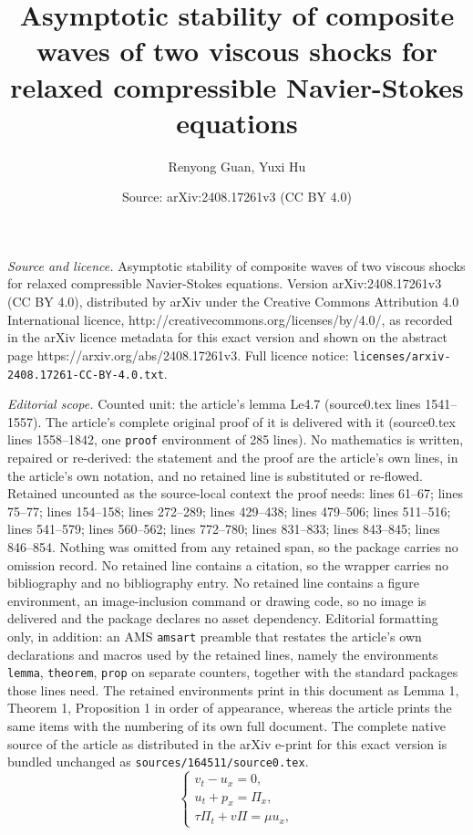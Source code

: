 \documentclass[10pt,a4paper]{amsart}
\title{Asymptotic stability of composite waves of two viscous shocks for relaxed compressible Navier-Stokes equations}
\author{Renyong Guan, Yuxi Hu}
\date{Source: arXiv:2408.17261v3 (CC BY 4.0)}
\begin{document}
\maketitle

\noindent\emph{Source and licence.} Asymptotic stability of composite waves of two viscous shocks for relaxed compressible Navier-Stokes equations. Version arXiv:2408.17261v3 (CC BY 4.0), distributed by arXiv under the Creative Commons Attribution 4.0 International licence, http://creativecommons.org/licenses/by/4.0/, as recorded in the arXiv licence metadata for this exact version and shown on the abstract page https://arxiv.org/abs/2408.17261v3. Full licence notice: \texttt{licenses/arxiv-2408.17261-CC-BY-4.0.txt}.\par\smallskip

\noindent\textit{Editorial scope.} Counted unit: the article's lemma Le4.7 (source0.tex lines 1541--1557). The article's complete original proof of it is delivered with it (source0.tex lines 1558--1842, one \texttt{proof} environment of 285 lines). No mathematics is written, repaired or re-derived: the statement and the proof are the article's own lines, in the article's own notation, and no retained line is substituted or re-flowed.  Retained uncounted as the source-local context the proof needs: lines 61--67; lines 75--77; lines 154--158; lines 272--289; lines 429--438; lines 479--506; lines 511--516; lines 541--579; lines 560--562; lines 772--780; lines 831--833; lines 843--845; lines 846--854.  Nothing was omitted from any retained span, so the package carries no omission record.  No retained line contains a citation, so the wrapper carries no bibliography and no bibliography entry.  No retained line contains a figure environment, an image-inclusion command or drawing code, so no image is delivered and the package declares no asset dependency.  Editorial formatting only, in addition: an AMS \texttt{amsart} preamble that restates the article's own declarations and macros used by the retained lines, namely the environments \texttt{lemma}, \texttt{theorem}, \texttt{prop} on separate counters, together with the standard packages those lines need.  The retained environments print in this document as Lemma 1, Theorem 1, Proposition 1 in order of appearance, whereas the article prints the same items with the numbering of its own full document.  The complete native source of the article as distributed in the arXiv e-print for this exact version is bundled unchanged as \texttt{sources/164511/source0.tex}.
\begin{equation}\label{1.3}
\begin{cases}
v_t-u_x=0,\\
u_t+p_x=\Pi_x,\\
\tau \Pi_t+v\Pi=\mu u_x,
\end{cases}
\end{equation}
\end{document}
